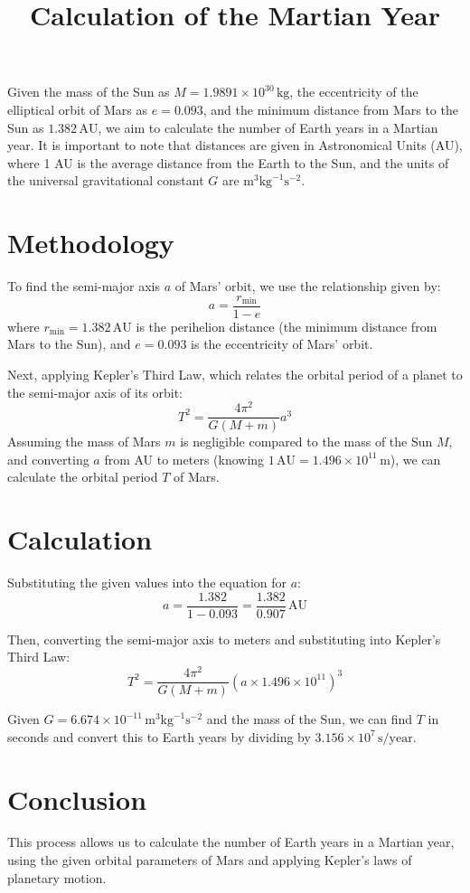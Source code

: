 \documentclass{article}
\begin{document}
\title{Calculation of the Martian Year}
\date{}
\maketitle

Given the mass of the Sun as $M = 1.9891 \times 10^{30} \, \text{kg}$, the eccentricity of the elliptical orbit of Mars as $e = 0.093$, and the minimum distance from Mars to the Sun as $1.382 \, \text{AU}$, we aim to calculate the number of Earth years in a Martian year. It is important to note that distances are given in Astronomical Units (AU), where 1 AU is the average distance from the Earth to the Sun, and the units of the universal gravitational constant $G$ are $\text{m}^3\text{kg}^{-1}\text{s}^{-2}$.

\section*{Methodology}

To find the semi-major axis $a$ of Mars' orbit, we use the relationship given by:
\[ a = \frac{r_{\text{min}}}{1 - e} \]
where $r_{\text{min}} = 1.382 \, \text{AU}$ is the perihelion distance (the minimum distance from Mars to the Sun), and $e = 0.093$ is the eccentricity of Mars' orbit.

Next, applying Kepler's Third Law, which relates the orbital period of a planet to the semi-major axis of its orbit:
\[ T^2 = \frac{4\pi^2}{G(M+m)}a^3 \]
Assuming the mass of Mars $m$ is negligible compared to the mass of the Sun $M$, and converting $a$ from AU to meters (knowing $1 \, \text{AU} = 1.496 \times 10^{11} \, \text{m}$), we can calculate the orbital period $T$ of Mars.

\section*{Calculation}

Substituting the given values into the equation for $a$:
\[ a = \frac{1.382}{1 - 0.093} = \frac{1.382}{0.907} \, \text{AU} \]

Then, converting the semi-major axis to meters and substituting into Kepler's Third Law:
\[ T^2 = \frac{4\pi^2}{G(M+m)}\left(a \times 1.496 \times 10^{11}\right)^3 \]

Given $G = 6.674 \times 10^{-11} \, \text{m}^3\text{kg}^{-1}\text{s}^{-2}$ and the mass of the Sun, we can find $T$ in seconds and convert this to Earth years by dividing by $3.156 \times 10^7 \, \text{s/year}$.

\section*{Conclusion}

This process allows us to calculate the number of Earth years in a Martian year, using the given orbital parameters of Mars and applying Kepler's laws of planetary motion.
\end{document}
